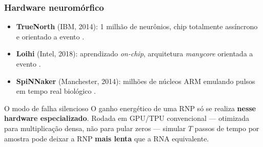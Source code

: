 \begin{frame}
	\frametitle{Hardware neuromórfico}
	\begin{itemize}
		\item \textbf{TrueNorth} (IBM, 2014): 1 milhão de neurônios, chip totalmente assíncrono e orientado a evento \cite{merolla2014truenorth}.
		\item \textbf{Loihi} (Intel, 2018): aprendizado \textit{on-chip}, arquitetura \textit{manycore} orientada a evento \cite{davies2018loihi}.
		\item \textbf{SpiNNaker} (Manchester, 2014): milhões de núcleos ARM emulando pulsos em tempo real biológico \cite{furber2014spinnaker}.
	\end{itemize}
	\vspace{8pt}
	\begin{alertblock}{O modo de falha silencioso}
		O ganho energético de uma RNP só se realiza \textbf{nesse hardware especializado}. Rodada em GPU/TPU convencional --- otimizada para multiplicação densa, não para pular zeros --- simular $T$ passos de tempo por amostra pode deixar a RNP \textbf{mais lenta} que a RNA equivalente.
	\end{alertblock}
\end{frame}
